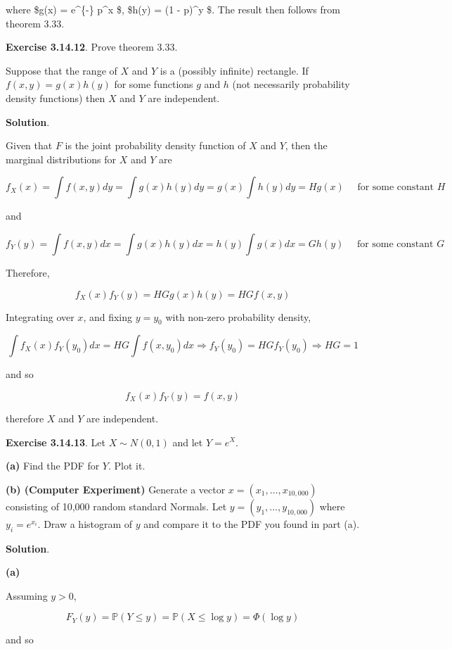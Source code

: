 where \$g(x) = e\^{}\{-\lambda\}  p\^{}x \$, \$h(y)
=  (1 - p)\^{}y \$. The result then follows from
theorem 3.33.

\textbf{Exercise 3.14.12}. Prove theorem 3.33.

Suppose that the range of \(X\) and \(Y\) is a (possibly infinite)
rectangle. If \(f(x, y) = g(x) h(y)\) for some functions \(g\) and \(h\)
(not necessarily probability density functions) then \(X\) and \(Y\) are
independent.

\textbf{Solution}.

Given that \(F\) is the joint probability density function of \(X\) and
\(Y\), then the marginal distributions for \(X\) and \(Y\) are

\[ f_X(x) = \int f(x, y) dy = \int g(x) h(y) dy = g(x) \int h(y) dy = H g(x) \quad \text{ for some constant } H \]

and

\[ f_Y(y) = \int f(x, y) dx = \int g(x) h(y) dx = h(y) \int g(x) dx = G h(y) \quad \text{ for some constant } G \]

Therefore,

\[ f_X(x) f_Y(y) = HG g(x) h(y) = HG f(x, y) \]

Integrating over \(x\), and fixing \(y = y_0\) with non-zero probability
density,

\[ \int f_X(x) f_Y(y_0) dx = HG \int f(x, y_0) dx \Longrightarrow f_Y(y_0) = HG f_Y(y_0) \Longrightarrow HG = 1 \]

and so

\[ f_X(x) f_Y(y) = f(x, y) \]

therefore \(X\) and \(Y\) are independent.

\textbf{Exercise 3.14.13}. Let \(X \sim N(0, 1)\) and let \(Y = e^X\).

\textbf{(a)} Find the PDF for \(Y\). Plot it.

\textbf{(b) (Computer Experiment)} Generate a vector
\(x = (x_1, \dots, x_{10,000})\) consisting of 10,000 random standard
Normals. Let \(y = (y_1, \dots, y_{10,000})\) where \(y_i = e^{x_i}\).
Draw a histogram of \(y\) and compare it to the PDF you found in part
(a).

\textbf{Solution}.

\textbf{(a)}

Assuming \(y > 0\),

\[ F_Y(y) = \mathbb{P}(Y \leq y) = \mathbb{P}(X \leq \log y) = \Phi(\log y) \]

and so

